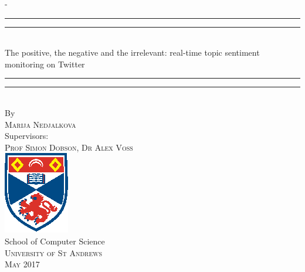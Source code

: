 \begin{titlingpage}
\begin{SingleSpace}
\calccentering{\unitlength} 
\begin{adjustwidth*}{\unitlength}{-\unitlength}
\begin{center}
\rule[0.5ex]{\linewidth}{2pt}\vspace*{-\baselineskip}\vspace*{3.2pt}
\rule[0.5ex]{\linewidth}{1pt}\\[\baselineskip]
{\HUGE The positive, the negative and the irrelevant: real-time topic sentiment monitoring on Twitter }\\[4mm]
\rule[0.5ex]{\linewidth}{1pt}\vspace*{-\baselineskip}\vspace{3.2pt}
\rule[0.5ex]{\linewidth}{2pt}\\
\vspace{6.5mm}
{\large By}\\
\vspace{6.5mm}
{\large\textsc{Marija Nedjalkova}}\\
\vspace{11mm}
{\large Supervisors:}\\
\vspace{6.5mm}
{\large\textsc{Prof Simon Dobson, Dr Alex Voss}}\\
\vspace{11mm}
\includegraphics[scale=4]{logos/StAndrewsNoText}\\
\vspace{6mm}
{\large School of Computer Science\\
\textsc{University of St Andrews}}\\
\vspace{11mm}
\vspace{9mm}
{\large\textsc{May 2017}}
\vspace{12mm}
\end{center}
\end{adjustwidth*}
\end{SingleSpace}
\end{titlingpage}